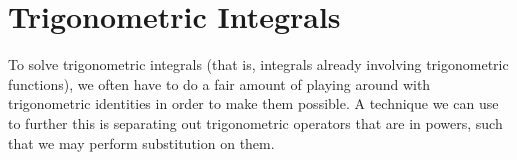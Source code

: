 

\section{Trigonometric Integrals}

To solve trigonometric integrals (that is, integrals already involving trigonometric functions),
we often have to do a fair amount of playing around with trigonometric identities in order to make them possible.
A technique we can use to further this is separating out trigonometric operators that are in powers, such that we may perform substitution on them.

